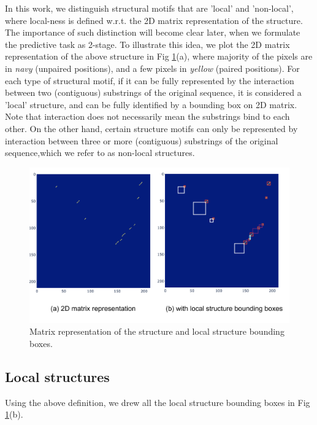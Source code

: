 \documentclass[12pt]{article}
\begin{document}
In this work, we distinguish structural motifs that are 'local' and 'non-local',
where local-ness is defined w.r.t. the 2D matrix representation of the structure.
The importance of such distinction will become clear later, when we formulate the predictive task as 2-stage.
To illustrate this idea, we plot the 2D matrix representation of the above structure
in Fig \ref{fig:structural_motif_2d_matrix}(a),
where majority of the pixels are in \textit{navy} (unpaired positions),
and a few pixels in \textit{yellow} (paired positions).
For each type of structural motif, if it can be fully represented by the interaction between
two (contiguous) substrings of the original sequence, it is considered a 'local' structure,
and can be fully identified by a bounding box on 2D matrix.
Note that interaction does not necessarily mean the substrings bind to each other.
On the other hand, certain structure motifs can only be represented by interaction between
three or more (contiguous) substrings of the original sequence,which we refer to as non-local structures.

\begin{figure}[h]
    \centering
    \includegraphics[width=\textwidth]{plot/structural_motif_2d_matrix.png}
    \caption{Matrix representation of the structure and local structure bounding boxes.}
    \label{fig:structural_motif_2d_matrix}
    \centering
\end{figure}


\subsection{Local structures}


Using the above definition, we drew all the local structure bounding boxes
in Fig \ref{fig:structural_motif_2d_matrix}(b).
\end{document}
